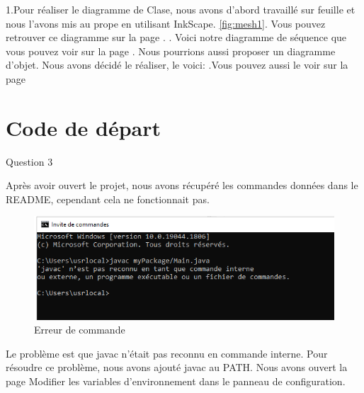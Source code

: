 \documentclass{article}
\begin{document}





1.Pour réaliser le diagramme de Clase, nous avons d'abord travaillé sur feuille et nous l'avons mis au prope en utilisant InkScape.  \ref{fig:mesh1}. Vous pouvez retrouver ce diagramme sur la page \pageref{fig:mesh1}.
. Voici notre diagramme de séquence %
 que vous pouvez voir sur la page%
. Nous pourrions aussi proposer un diagramme d'objet. Nous avons décidé le réaliser, le voici:
.Vous pouvez aussi le voir sur la page%
\newpage
\section{Code de départ}


Question 3
\newline


Après avoir ouvert le projet, nous avons récupéré les commandes données dans le README, cependant cela ne fonctionnait pas.
\newline

\begin{figure}[h]

\includegraphics[width=1\textwidth]{erreurjavac.png}
\caption{Erreur de commande}
\end{figure}

 Le problème est que javac n'était pas reconnu en commande interne. Pour résoudre ce problème, nous avons ajouté javac au PATH.
 Nous avons ouvert la page Modifier les variables d'environnement dans le panneau de configuration.
\end{document}
